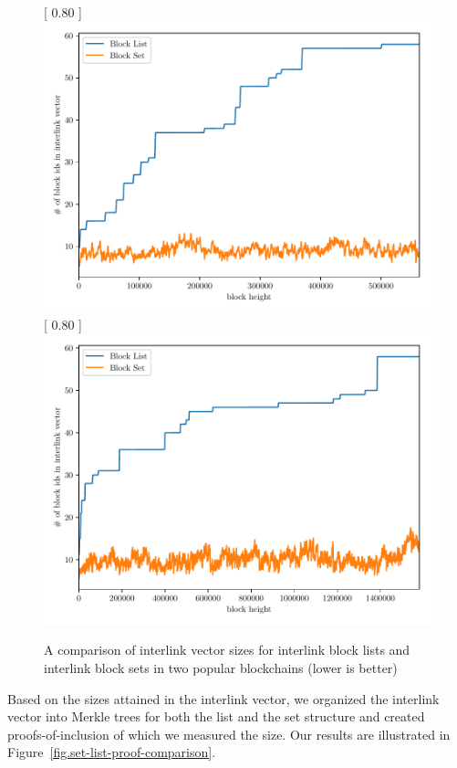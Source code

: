 \begin{figure}
   \centering
   [
       0.80\textwidth
   ]
   {
       \includegraphics[width=0.85 \textwidth]
       {figures/interlink-vector-blocklist-vs-blockset.pdf}
   }
   \vskip 0pt
   [
       0.80\textwidth
   ]
   {
       \includegraphics[width=0.85 \textwidth]
       {figures/interlink-vector-blocklist-vs-blockset-litecoin.pdf}
   }
   \caption{A comparison of interlink vector sizes for interlink block lists and interlink block sets in two popular blockchains (lower is better)}
   \label{fig.set-list-vector-comparison}
\end{figure}

Based on the sizes attained in the interlink vector, we organized the interlink
vector into Merkle trees for both the list and the set structure and created
proofs-of-inclusion of which we measured the size. Our results are illustrated
in Figure~\ref{fig.set-list-proof-comparison}.

